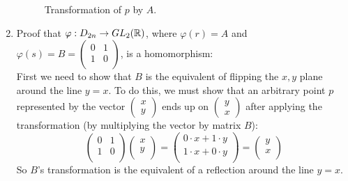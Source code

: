 \documentclass[12pt]{article}
\begin{document}
\begin{enumerate}[label=\textbf{\alph*.}]
\begin{figure}[H]
\begin{tikzpicture}[scale=2.5]
                    \end{tikzpicture}
            
                    \caption{\label{fig:figure1} Transformation of $p$ by $A$.}
                \end{figure}
        \item 
            Proof that $\varphi: D_{2n} \to GL_2(\R)$,
            where $\varphi(r) = A$ and $\varphi(s) = B =
            \begin{pmatrix}
                0 & 1 \\
                1 & 0 \\
            \end{pmatrix}$,
            is a homomorphism: \\
            First we need to show that $B$ is the equivalent of flipping
            the $x, y$ plane around the line $y = x$.
            To do this, we must show that an arbitrary point $p$
            represented by the vector $\begin{pmatrix} x \\ y \end{pmatrix}$
            ends up on $\begin{pmatrix} y \\ x \end{pmatrix}$
            after applying the transformation
            (by multiplying the vector by matrix $B$):
            \[  \begin{pmatrix}
                0 & 1 \\
                1 & 0 \\
            \end{pmatrix} 
            \begin{pmatrix}
                x \\
                y \\
            \end{pmatrix} 
            = \begin{pmatrix}
                0 \cdot x + 1 \cdot y \\
                1 \cdot x + 0 \cdot y \\
            \end{pmatrix} 
            =  \begin{pmatrix}
                y \\
                x \\
            \end{pmatrix} \]
            So $B$'s transformation is the equivalent of a reflection 
            around the line $y = x$.
        

\end{enumerate}
\end{document}
